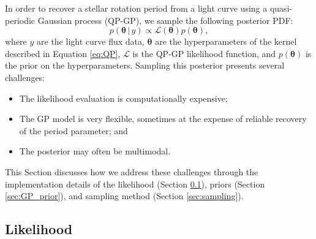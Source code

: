 \documentclass[a4paper,fleqn,usenatbib,useAMS]{mnras}
\begin{document}
In order to recover a stellar rotation period from a light curve using a
quasi-periodic Gaussian process (QP-GP), we sample the following posterior
PDF:
\begin{equation}
\label{eq:posterior}
p({\bm \theta}\,|\,y) \propto \mathcal L({\bm \theta}) p({\bm \theta}),
\end{equation}
where $y$ are the light curve flux data, $\bm \theta$ are the hyperparameters
of the kernel described in Equation \ref{eq:QP}, $\mathcal L$ is the
QP-GP likelihood function, and $p({\bm \theta})$ is the prior on the
hyperparameters.  Sampling this posterior presents several challenges:
\begin{itemize}
    \item The likelihood evaluation is computationally expensive;
    \item The GP model is very flexible, sometimes at the expense of
    reliable recovery of the period parameter; and
    \item The posterior may often be multimodal.
\end{itemize}
This Section discusses how we address these challenges through
the implementation details of the likelihood (Section \ref{sec:GP_lhood}), priors
(Section \ref{sec:GP_prior}), and sampling method (Section \ref{sec:sampling}).

\subsection{Likelihood}
\label{sec:GP_lhood}
\end{document}
